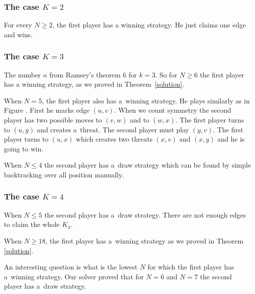 \subsubsection{The case $K=2$}

For every $N \ge 2$, the first player has a winning strategy. He just claims one edge
and wins.

\subsubsection{The case $K=3$}

The number $n$ from Ramsey's theorem 6 for $k=3$. So for $N \ge
6$ the first player has a winning strategy, as we proved in
Theorem~\ref{solution}. 

When $N=5$, the first player also has a~winning strategy. He plays similarly as in
Figure . First he marks edge $(u,v)$. When we count symmetry the second player has
two possible moves to $(v,w)$ and to $(w,x)$. The first player turns to $(u,y)$ and
creates a~threat. The second player must play $(y,v)$. The first player turns to
$(u,x)$ which creates two threats $(x,v)$ and $(x,y)$ and he is going to win. 

When $N \le 4$ the second player has a~draw strategy which can be found by simple
backtracking over all position manually. 

\subsubsection{The case $K=4$}

When $N \le 5$ the second player has a~draw strategy. There are not enough edges to
claim the whole $K_4$.

When $N \ge 18$, the first player has a~winning strategy as we proved in Theorem
\ref{solution}.

An interesting question is what is the lowest $N$ for which the first player has
a~winning strategy. Our solver proved that for $N=6$ and $N=7$ the second
player has a~draw strategy.

